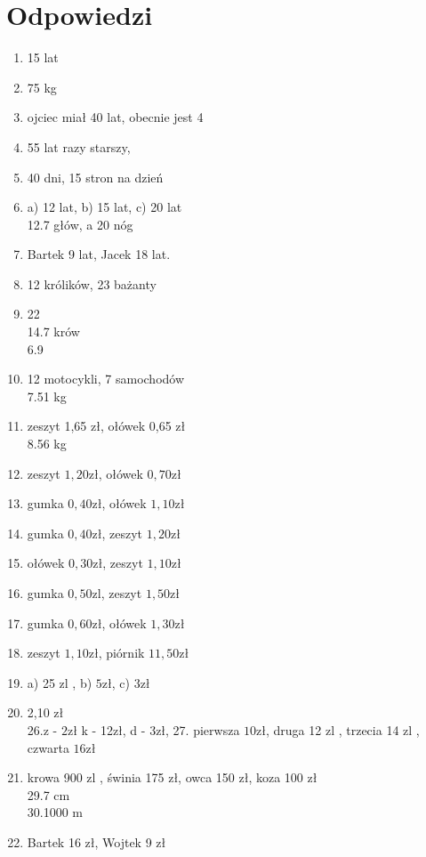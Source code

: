 \documentclass[10pt]{article}
\begin{document}
\section*{Odpowiedzi}
\begin{enumerate}
  \item 15 lat
  \item 75 kg
  \item ojciec miał 40 lat, obecnie jest 4
  \item 55 lat razy starszy,
  \item 40 dni, 15 stron na dzień
  \item a) 12 lat, b) 15 lat, c) 20 lat\\
12.7 głów, a 20 nóg
  \item Bartek 9 lat, Jacek 18 lat.
  \item 12 królików, 23 bażanty
  \item 22\\
14.7 krów\\
6.9
  \item 12 motocykli, 7 samochodów\\
7.51 kg
  \item zeszyt 1,65 zł, ołówek 0,65 zł\\
8.56 kg
  \item zeszyt \(1,20 \mathrm{zł}\), ołówek \(0,70 \mathrm{zł}\)
  \item gumka \(0,40 \mathrm{zł}\), ołówek \(1,10 \mathrm{zł}\)
  \item gumka \(0,40 \mathrm{zł}\), zeszyt \(1,20 \mathrm{zł}\)
  \item ołówek \(0,30 \mathrm{zł}\), zeszyt \(1,10 \mathrm{zł}\)
  \item gumka \(0,50 \mathrm{zl}\), zeszyt \(1,50 \mathrm{zł}\)
  \item gumka \(0,60 \mathrm{zł}\), ołówek \(1,30 \mathrm{zł}\)
  \item zeszyt \(1,10 \mathrm{zł}\), piórnik \(11,50 \mathrm{zł}\)
  \item a) 25 zl , b) \(5 \mathrm{zł}\), c) \(3 \mathrm{zł}\)
  \item 2,10 zł\\
26.z - \(2 \mathrm{zł}\) k - 12zł, d - 3zł, 27. pierwsza \(10 \mathrm{zł}\), druga 12 zl , trzecia 14 zl , czwarta \(16 \mathrm{zł}\)
  \item krowa 900 zl , świnia 175 zł, owca 150 zł, koza 100 zł\\
29.7 cm\\
30.1000 m
  \item Bartek 16 zł, Wojtek 9 zł

\end{enumerate}
\end{document}
